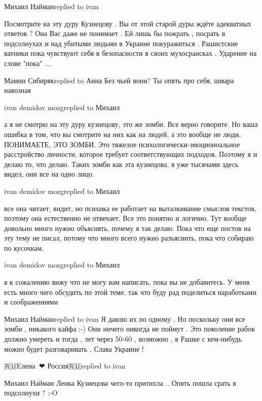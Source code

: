  
 
 
 
 

Михаил Найманreplied to ivan

Посмотрите на эту дуру Кузнецову . Вы от этой старой дуры ждёте адекватных
ответов ? Она Вас даже не понимает . Ей лишь бы пожрать , посрать в подсолнухах
и над убитыми людьми в Украине покуражиться . Рашистские ватники пока чувствуют
себя в безопасности в своих мухосрансках . Ударение на слове "пока" ...

Мамин Сибирякreplied to Анна
Без чьей вони?  Ты опять про себя, шмара навозная

ivan demidov mozgreplied to Михаил

а я не смотрю на эту дуру кузнецову, это же зомби. Все верно говорите. Но ваша
ошибка в том, что вы смотрите на них как на людей, а это вообще не люди.
ПОНИМАЕТЕ, ЭТО ЗОМБИ. Это тяжелое психологически-эмоционоальное расстройство
личности, которое требует соответствующих подходов. Поэтому я и делаю то, что
делаю. Таких зомби как эта кузнецова, я уже тысячами здесь видел, они все на
одно лицо.

ivan demidov mozgreplied to Михаил

все она читает, видит, но психика ее работает на выталкивание смыслов текстов,
поэтому она естественно не отвечает. Все это понятно и логично. Тут вообще
довольно много нужно объяснять, почему я так делаю. Пока что еще постов на эту
тему не писал, потому что много всего нужно разъяснить, пока что собираю по
кусочкам.

ivan demidov mozgreplied to Михаил

я к сожалению вижу что не могу вам написать, пока вы не добавитесь. У меня есть
много чего обсудить по этой теме, так что буду рад поделиться наработками и
соображениями

Михаил Найманreplied to ivan
Я давлю их по одному . Но поскольку они все зомби , никакого кайфа :-) Они ничего никогда не поймут . Это поколение рабов должно умереть и тогда , лет через 50-60 , возможно , в Рашке с кем-нибудь можно будет разговаривать . Слава Украине !

🇷🇺Eлена🤍💙❤ Россия🇷🇺replied to ivan

Михаил Найман
Ленка Кузнецова чего-то притихла .. Опять пошла срать в подсолнухи ? :-O

